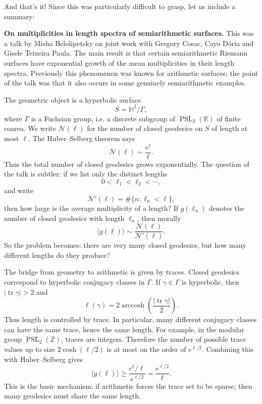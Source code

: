 \noindent
And that's it! Since this was particularly
difficult to grasp, let us
include a summary:

\medskip\noindent
{\bf On multiplicities in length spectra of
semiarithmetic surfaces.}
This was a talk by Misha Belolipetsky on
joint work with Gregory Cosac, Cayo Dória
and Gisele Teixeira Paula. The main result
is that certain semiarithmetic Riemann
surfaces have exponential growth of the
mean multiplicities in their length spectra.
Previously this phenomenon was known for
arithmetic surfaces; the point of the talk
was that it also occurs in some genuinely
semiarithmetic examples.

\medskip\noindent
The geometric object is a hyperbolic surface
$$
S=\mathbb{H}^2/\Gamma,
$$
where $\Gamma$ is a Fuchsian group, i.e. a
discrete subgroup of
$\operatorname{PSL}_2(\mathbb{R})$ of finite
coarea. We write $\mathcal{N}(\ell)$ for the
number of closed geodesics on $S$ of length
at most $\ell$. The Huber--Selberg theorem
says
$$
\mathcal{N}(\ell)\sim \frac{e^\ell}{\ell}.
$$
Thus the total number of closed geodesics
grows exponentially. The question of the talk
is subtler: if we list only the distinct
lengths
$$
0<\ell_1<\ell_2<\cdots,
$$
and write
$$
\mathcal{N}'(\ell)=\#\{n:\ell_n<\ell\},
$$
then how large is the average multiplicity
of a length? If $g(\ell_n)$ denotes the
number of closed geodesics with length
$\ell_n$, then morally
$$
\langle g(\ell)\rangle
\sim
\frac{\mathcal{N}(\ell)}{\mathcal{N}'(\ell)}.
$$
So the problem becomes: there are very many
closed geodesics, but how many different
lengths do they produce?

\medskip\noindent
The bridge from geometry to arithmetic is
given by traces. Closed geodesics correspond
to hyperbolic conjugacy classes in
$\Gamma$. If $\gamma\in\Gamma$ is
hyperbolic, then $|\operatorname{tr}\gamma|>2$
and
$$
\ell(\gamma)
=
2\operatorname{arccosh}
\left(\frac{|\operatorname{tr}\gamma|}{2}\right).
$$
Thus length is controlled by trace. In
particular, many different conjugacy classes
can have the same trace, hence the same
length. For example, in the modular group
$\operatorname{PSL}_2(\mathbb{Z})$, traces
are integers. Therefore the number of
possible trace values up to size
$2\cosh(\ell/2)$ is at most on the order of
$e^{\ell/2}$. Combining this with
Huber--Selberg gives
$$
\langle g(\ell)\rangle
\geq
\frac{e^\ell/\ell}{e^{\ell/2}}
=
\frac{e^{\ell/2}}{\ell}.
$$
This is the basic mechanism: if arithmetic
forces the trace set to be sparse, then many
geodesics must share the same length.

